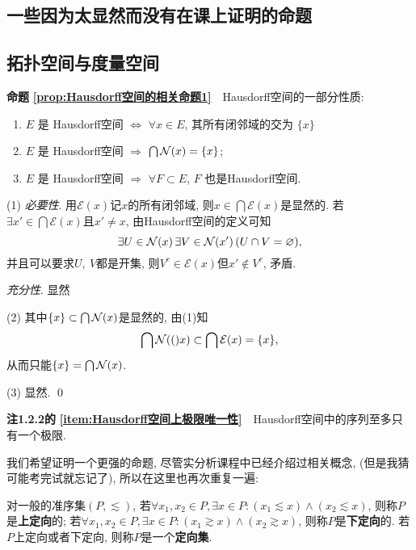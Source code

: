 	
\begin{appendix}
	
	\chapter{一些因为太显然而没有在课上证明的命题}
	
	\section{拓扑空间与度量空间}
	
	\textbf{命题\,\,\ref{prop:Hausdorff空间的相关命题1}}\ \ Hausdorff空间的一部分性质:
	\begin{enumerate}[(1)]
		\item  $ E $ 是 Hausdorff空间 $ \Longleftrightarrow $ $ \forall x\in E $, 其所有闭邻域的交为 $\{ x \}$
	    \item $ E $ 是 Hausdorff空间 $ \Longrightarrow $ $\bigcap \mathcal{N}(x)=\{x\}$;
	    \item $ E $ 是 Hausdorff空间 $ \Longrightarrow $ $ \forall F\subset E $, $ F $ 也是Hausdorff空间. 
	\end{enumerate}
	\begin{Proof}
	(1) \textsl{必要性}. 用$ \mathcal{E}(x) $记$ x $的所有闭邻域, 则$ x\in\bigcap\mathcal{E}(x) $是显然的. 若$ \exists x'\in\bigcap\mathcal{E}(x) $且$ x'\ne x $, 由Hausdorff空间的定义可知
	\[
	\exists U\in\mathcal{N}(x)\,\exists V\in\mathcal{N}(x')\,(U\cap V=\varnothing),
	\]
	并且可以要求$ U,\ V $都是开集, 则$ V^c\in\mathcal{E}(x) $但$ x'\notin V^c $, 矛盾.
	
	\textsl{充分性}. 显然
	
	(2) 其中$ \{x\}\subset\bigcap\mathcal{N}(x) $是显然的, 由(1)知
	\[
	\bigcap\mathcal{N}(()x)\subset\bigcap\mathcal{E}(x)=\{x\},
	\]
	从而只能$ \{x\}=\bigcap\mathcal{N}(x) $.
	
	(3) 显然.	\qed
	\end{Proof}
	
	\textbf{注1.2.2的\,\,\ref{item:Hausdorff空间上极限唯一性}}\ \ Hausdorff空间中的序列至多只有一个极限.
	
	我们希望证明一个更强的命题, 尽管实分析课程中已经介绍过相关概念, (但是我猜可能考完试就忘记了), 所以在这里也再次重复一遍:
	\begin{Definition}
		对一般的准序集$ (P, \lesssim) $, 若$ \forall x_1, x_2\in P, \exists x\in P : (x_1\lesssim x)\land (x_2\lesssim x) $, 则称$ P $是\textbf{上定向}的; 若$ \forall x_1, x_2\in P, \exists x\in P : (x_1\gtrsim x)\land (x_2\gtrsim x) $, 则称$ P $是\textbf{下定向}的. 若$ P $上定向或者下定向, 则称$ P $是一个\textbf{定向集}.
		

\end{Definition}
\end{appendix}
